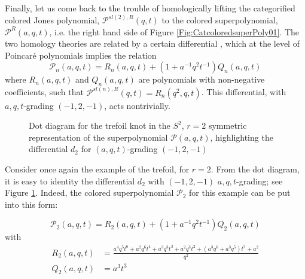 \documentclass[a4paper,titlepage,twoside]{book}
\begin{document}
Finally, let us come back to the trouble of homologically lifting the categorified colored Jones polynomial, $\mathcal{P}^{sl{(2)},R}{(q,t)}$ to the colored superpolynomial, $\mathcal{P}^R{(a,q,t)}$, i.e. the right hand side of Figure \ref{Fig:CatcoloredsuperPoly01}.  The two homology theories are related by a certain differential \cite{GukovStosic2012}, which at the level of Poincar\'{e} polynomials implies the relation
\begin{equation}
\mathcal{P}_n{(a,q,t)} = R_n{(a,q,t)} + (1+a^{-1} q^2 t^{-1})Q_n{(a,q,t)}  \label{eq:diffbetweenhomo00}
\end{equation}
where $R_n{(a,q,t)}$ and $Q_n{(a,q,t)}$ are polynomials with non-negative coefficients, such that $\mathcal{P}^{ sl{(n)},R}{ (q,t)} = R_n{(q^2, q,t)}$.  This differential, with $a,q,t$-grading $(-1,2,-1)$, acts nontrivially.  


\begin{figure}[h]
\begin{center}
\end{center}
\caption{Dot diagram for the trefoil knot in the $S^2$, $r=2$ symmetric representation of the superpolynomial $\mathcal{P}{(a,q,t)}$, highlighting the differential $d_2$ for $(a,q,t)$-grading $(-1,2,-1)$} \label{Fig:dotdiagramtrefoilr03}
\end{figure}

Consider once again the example of the trefoil, for $r=2$.  From the dot diagram, it is easy to identity the differential $d_2$ with $(-1,2,-1)$ $a,q,t$-grading; see Figure \ref{Fig:dotdiagramtrefoilr03}.  Indeed, the colored superpolynomial $\mathcal{P}_2$ for this example can be put into this form:

\begin{equation}
  \mathcal{P}_2{(a,q,t)} = R_2{(a,q,t)} + ( 1 + a^{-1} q^2 t^{-1}) Q_2{(a,q,t)}
\end{equation}
with 
\begin{equation}
  \begin{aligned}
    R_2{(a,q,t)} & = \frac{a^{4} q^{5} t^{6} + a^{2} q^{6} t^{4} + a^{3} q^{3} t^{3} + a^{2} q^{3} t^{2} + {\left(a^{3} q^{6} + a^{3} q^{5}\right)} t^{5} + a^{2}}{q^{2}}    \\
    Q_2{(a,q,t)} & = a^3 t^3
  \end{aligned}
\end{equation}
\end{document}
